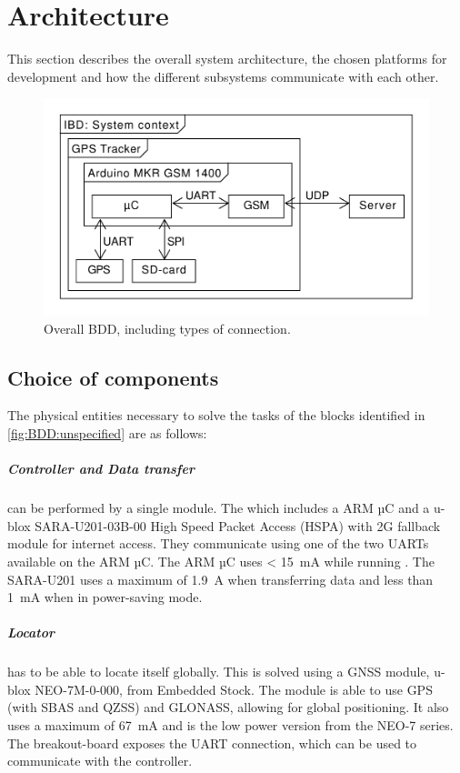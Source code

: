 
\chapter{Architecture}
\label{sec:Architecture}
This section describes the overall system architecture, the chosen platforms for development and how the different subsystems communicate with each other.

\begin{figure}[H]
	\centering
	\includegraphics[width=0.7\linewidth]{gfx/Design/Overall_IBD.pdf}
	\caption{Overall BDD, including types of connection.}
	\label{fig:BDD:overall}
\end{figure}

\section{Choice of components}
The physical entities necessary to solve the tasks of the blocks identified in \cref{fig:BDD:unspecified} are as follows:

\paragraph{Controller and Data transfer} can be performed by a single module. The \MKR which includes a \SAMD ARM µC and a u-blox SARA-U201-03B-00 High Speed Packet Access (HSPA) with 2G fallback module for internet access.
They communicate using one of the two UARTs available on the \SAMD ARM µC.
The \SAMD ARM µC uses \SI{< 15}{\milli\ampere} while running \cite[p.~791-794]{SAMD21}.
The SARA-U201 uses a maximum of \SI{1.9}{\ampere} when transferring data \cite[p.~26]{SARAU201} and less than \SI{1}{\milli\ampere} when in power-saving mode.

\paragraph{Locator} has to be able to locate itself globally. This is solved using a GNSS module, u-blox NEO-7M-0-000, from Embedded Stock.
The module is able to use GPS (with SBAS and QZSS) and GLONASS, allowing for global positioning.
It also uses a maximum of \SI{67}{\milli\ampere} \cite[p.~17]{NEO7_Data} and is the low power version from the NEO-7 series.
The breakout-board exposes the UART connection, which can be used to communicate with the controller.

